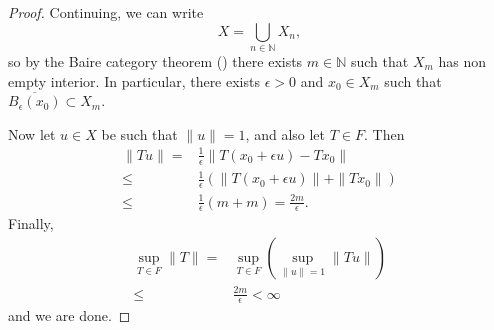 \documentclass[12pt]{article}
\begin{document}
\begin{refsection}
\begin{proof}
	Continuing, we can write 
	\begin{equation*}
		X=\bigcup_{n\in\mathbb{N}} X_n,
	\end{equation*}
	so by the Baire category theorem () there exists $m\in\mathbb{N}$ such that $X_m$ has non empty interior. In particular, there exists $\epsilon>0$ and $x_0\in X_m$ such that $\overline{B_\epsilon(x_0)}\subset X_m$. 

	Now let $u\in X$ be such that $\|u\|=1$, and also let $T\in F$. Then 
	\begin{align*}
		\|Tu\| =& \frac{1}{\epsilon} \|T(x_0+\epsilon u) - Tx_0 \| \\
		\leq& \frac{1}{\epsilon} ( \|T(x_0 + \epsilon u)\| + \|Tx_0\| ) \\
		\leq& \frac{1}{\epsilon} (m + m) = \frac{2m}{\epsilon}.
	\end{align*}
	Finally, 
	\begin{align*}
		\sup_{T\in F} \|T\| 
		=& \sup_{T\in F} \left( \sup_{\|u\|=1} \|Tu\| \right) \\
		\leq& \frac{2m}{\epsilon} < \infty
	\end{align*}
	and we are done.
\end{proof}


\nocite{pm_banach_alaoglu_proof}
\nocite{se_linear_open_conditions}
\nocite{wikipedia_open_mapping}
\nocite{pm_closed_graph_proof}
\nocite{wikipedia_ubp}
\printbibliography

\end{refsection}
\end{document}
